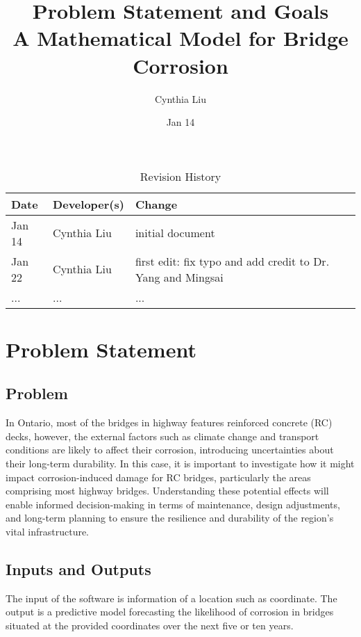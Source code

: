 \documentclass{article}
\title{Problem Statement and Goals\\A Mathematical Model for Bridge Corrosion}
\author{Cynthia Liu}
\date{Jan 14}
\begin{document}
\maketitle

\begin{table}[hp]
\caption{Revision History} \label{TblRevisionHistory}
\begin{tabularx}{\textwidth}{llX}
\toprule
\textbf{Date} & \textbf{Developer(s)} & \textbf{Change}\\
\midrule
Jan 14 & Cynthia Liu & initial document\\
Jan 22 & Cynthia Liu & first edit: fix typo and add credit to Dr. Yang and Mingsai\\
... & ... & ...\\
\bottomrule
\end{tabularx}
\end{table}

\section{Problem Statement}

\subsection{Problem}
In Ontario, most of the bridges in highway features reinforced concrete (RC) decks, however, the external factors such as climate change and transport conditions are likely to affect their corrosion, introducing uncertainties about their long-term durability. In this case, it is important to investigate how it might impact corrosion-induced damage for RC bridges, particularly the areas comprising most highway bridges. Understanding these potential effects will enable informed decision-making in terms of maintenance, design adjustments, and long-term planning to ensure the resilience and durability of the region's vital infrastructure.

\subsection{Inputs and Outputs}
The input of the software is information of a location such as coordinate. The output is a predictive model forecasting the likelihood of corrosion in bridges situated at the provided coordinates over the next five or ten years.
\end{document}
